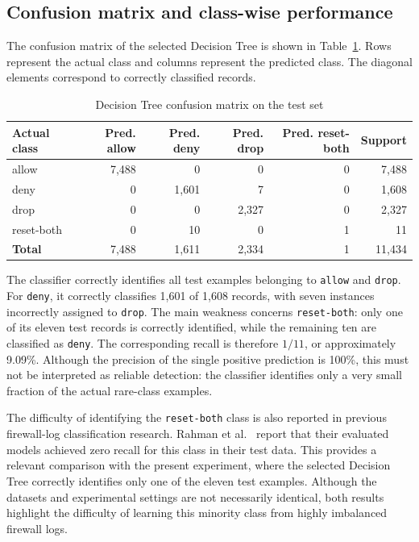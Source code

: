 \subsection{Confusion matrix and class-wise performance}

The confusion matrix of the selected Decision Tree is shown in Table~\ref{tab:dt-confusion}. Rows represent the actual class and columns represent the predicted class. The diagonal elements correspond to correctly classified records.

\begin{table}[htbp]
  \centering
  \caption{Decision Tree confusion matrix on the test set}
  \label{tab:dt-confusion}
  \small
  \begin{tabular}{|l|r|r|r|r|r|}
    \hline
    \textbf{Actual class} & \textbf{Pred. allow} & \textbf{Pred. deny} & \textbf{Pred. drop} & \textbf{Pred. reset-both} & \textbf{Support} \\
    \hline
    allow & 7,488 & 0 & 0 & 0 & 7,488 \\
    deny & 0 & 1,601 & 7 & 0 & 1,608 \\
    drop & 0 & 0 & 2,327 & 0 & 2,327 \\
    reset-both & 0 & 10 & 0 & 1 & 11 \\
    \hline
    \textbf{Total} & 7,488 & 1,611 & 2,334 & 1 & 11,434 \\
    \hline
  \end{tabular}
\end{table}

The classifier correctly identifies all test examples belonging to \texttt{allow} and \texttt{drop}. For \texttt{deny}, it correctly classifies 1,601 of 1,608 records, with seven instances incorrectly assigned to \texttt{drop}. The main weakness concerns \texttt{reset-both}: only one of its eleven test records is correctly identified, while the remaining ten are classified as \texttt{deny}. The corresponding recall is therefore $1/11$, or approximately 9.09\%. Although the precision of the single positive prediction is 100\%, this must not be interpreted as reliable detection: the classifier identifies only a very small fraction of the actual rare-class examples.

The difficulty of identifying the \texttt{reset-both} class is also reported in previous firewall-log classification research. Rahman et al.~\cite{rahman2023firewall} report that their evaluated models achieved zero recall for this class in their test data. This provides a relevant comparison with the present experiment, where the selected Decision Tree correctly identifies only one of the eleven test examples. Although the datasets and experimental settings are not necessarily identical, both results highlight the difficulty of learning this minority class from highly imbalanced firewall logs.

